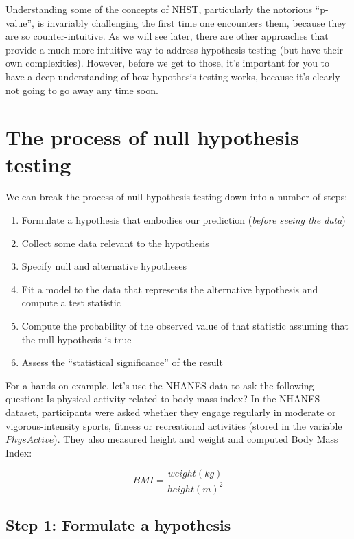 \documentclass[]{book}
\providecommand{\tightlist}{%
  \setlength{\itemsep}{0pt}\setlength{\parskip}{0pt}}
\theoremstyle{definition}
\theoremstyle{definition}
\theoremstyle{definition}
\theoremstyle{remark}
\begin{document}
Understanding some of the concepts of NHST, particularly the notorious
``p-value'', is invariably challenging the first time one encounters
them, because they are so counter-intuitive. As we will see later, there
are other approaches that provide a much more intuitive way to address
hypothesis testing (but have their own complexities). However, before we
get to those, it's important for you to have a deep understanding of how
hypothesis testing works, because it's clearly not going to go away any
time soon.

\section{The process of null hypothesis
testing}\label{the-process-of-null-hypothesis-testing}

We can break the process of null hypothesis testing down into a number
of steps:

\begin{enumerate}
\def\labelenumi{\arabic{enumi}.}
\tightlist
\item
  Formulate a hypothesis that embodies our prediction (\emph{before
  seeing the data})
\item
  Collect some data relevant to the hypothesis
\item
  Specify null and alternative hypotheses
\item
  Fit a model to the data that represents the alternative hypothesis and
  compute a test statistic
\item
  Compute the probability of the observed value of that statistic
  assuming that the null hypothesis is true
\item
  Assess the ``statistical significance'' of the result
\end{enumerate}

For a hands-on example, let's use the NHANES data to ask the following
question: Is physical activity related to body mass index? In the NHANES
dataset, participants were asked whether they engage regularly in
moderate or vigorous-intensity sports, fitness or recreational
activities (stored in the variable \(PhysActive\)). They also measured
height and weight and computed Body Mass Index:

\[
BMI = \frac{weight(kg)}{height(m)^2}
\]

\subsection{Step 1: Formulate a
hypothesis}\label{step-1-formulate-a-hypothesis}
\end{document}
